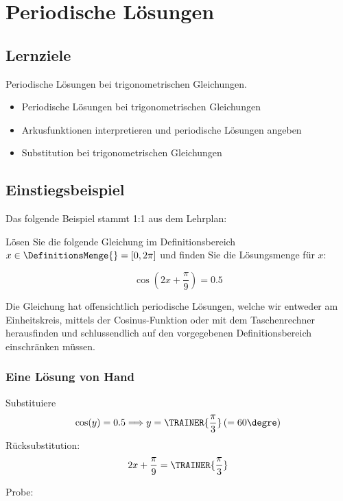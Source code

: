 
\section{Periodische Lösungen}

\subsection*{Lernziele}

Periodische Lösungen bei trigonometrischen Gleichungen.

\begin{itemize}
\item Periodische Lösungen bei trigonometrischen Gleichungen
\item Arkusfunktionen interpretieren und periodische Lösungen angeben
\item Substitution bei trigonometrischen Gleichungen
\end{itemize}
\newpage


\subsection{Einstiegsbeispiel}
Das folgende Beispiel stammt 1:1 aus dem Lehrplan:

Lösen Sie die folgende Gleichung im Definitionsbereich $x \in \DefinitionsMenge{} = [ 0, 2\pi]$ und finden Sie die Lösungsmenge für $x$:

$$\cos\left(2x+\frac{\pi}{9}\right) = 0.5$$

Die Gleichung hat offensichtlich periodische Lösungen, welche wir
entweder am Einheitskreis, mittels der Cosinus-Funktion oder mit dem
Taschenrechner herausfinden und schlussendlich auf den vorgegebenen
Definitionsbereich einschränken müssen.

\subsubsection{Eine Lösung von Hand}

Substituiere 
$$\cos(y) = 0.5 \Longrightarrow y=\TRAINER{\frac{\pi}3} \left(=60\degre\right)$$
Rücksubstitution:
$$ 2x+\frac{\pi}9 = \TRAINER{\frac{\pi}3}$$

Probe:

